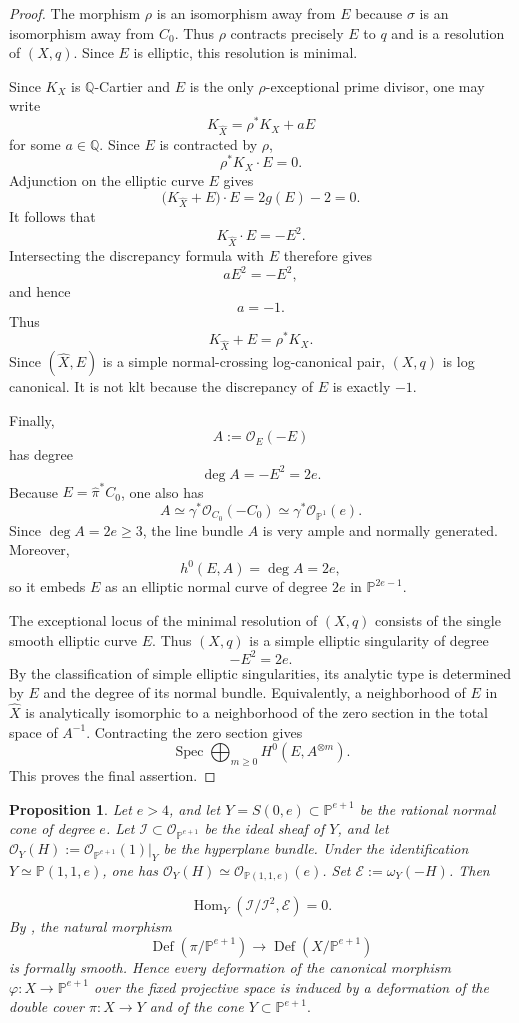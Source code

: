 \documentclass[11pt,twoside]{amsart}
\theoremstyle{plain}
\numberwithin{equation}{section}
\newtheorem{proposition}[theorem]{Proposition}
\theoremstyle{definition}
\begin{document}
\begin{proof}
The morphism $\rho$ is an isomorphism away from $E$ because $\sigma$ is an isomorphism away from $C_0$. Thus $\rho$ contracts precisely $E$ to $q$ and is a resolution of $(X,q)$. Since $E$ is elliptic, this resolution is minimal.

Since $K_X$ is $\mathbb Q$-Cartier and $E$ is the only $\rho$-exceptional prime divisor, one may write
\[
K_{\widehat X}
=
\rho^*K_X+aE
\]
for some $a\in\mathbb Q$. Since $E$ is contracted by $\rho$,
\[
\rho^*K_X\cdot E=0.
\]
Adjunction on the elliptic curve $E$ gives
\[
\bigl(K_{\widehat X}+E\bigr)\cdot E
=
2g(E)-2
=
0.
\]
It follows that
\[
K_{\widehat X}\cdot E=-E^2.
\]
Intersecting the discrepancy formula with $E$ therefore gives
\[
aE^2=-E^2,
\]
and hence
\[
a=-1.
\]
Thus
\[
K_{\widehat X}+E=\rho^*K_X.
\]
Since $(\widehat X,E)$ is a simple normal-crossing log-canonical pair, $(X,q)$ is log canonical. It is not klt because the discrepancy of $E$ is exactly $-1$.

Finally,
\[
A:=\mathcal O_E(-E)
\]
has degree
\[
\deg A=-E^2=2e.
\]
Because $E=\widehat\pi^*C_0$, one also has
\[
A
\simeq
\gamma^*\mathcal O_{C_0}(-C_0)
\simeq
\gamma^*\mathcal O_{\mathbb P^1}(e).
\]
Since $\deg A=2e\geq3$, the line bundle $A$ is very ample and normally generated. Moreover,
\[
h^0(E,A)=\deg A=2e,
\]
so it embeds $E$ as an elliptic normal curve of degree $2e$ in $\mathbb P^{2e-1}$.

The exceptional locus of the minimal resolution of $(X,q)$ consists of the single smooth elliptic curve $E$. Thus $(X,q)$ is a simple elliptic singularity of degree
\[
-E^2=2e.
\]
By the classification of simple elliptic singularities, its analytic type is determined by $E$ and the degree of its normal bundle. Equivalently, a neighborhood of $E$ in $\widehat X$ is analytically isomorphic to a neighborhood of the zero section in the total space of $A^{-1}$. Contracting the zero section gives
\[
\operatorname{Spec}
\bigoplus_{m\geq0}H^0\!\left(E,A^{\otimes m}\right).
\]
This proves the final assertion.
\end{proof}


\begin{proposition}\label{prop:hom-conormal-trace-zero-cone}
Let $e>4$, and let $Y=S(0,e)\subset \mathbb{P}^{e+1}$ be the rational normal cone of degree $e$. Let $\mathcal I\subset\mathcal O_{\mathbb{P}^{e+1}}$ be the ideal sheaf of $Y$, and let $\mathcal O_Y(H):=\mathcal O_{\mathbb{P}^{e+1}}(1)|_Y$ be the hyperplane bundle. Under the identification $Y\simeq\mathbb P(1,1,e)$, one has $\mathcal O_Y(H)\simeq\mathcal O_{\mathbb P(1,1,e)}(e)$. Set $\mathcal E:=\omega_Y(-H)$. Then

$$
\operatorname{Hom}_Y(\mathcal I/\mathcal I^2,\mathcal E)=0.
$$
By , the natural morphism
$$
\operatorname{Def}(\pi/\mathbb P^{e+1})
\longrightarrow
\operatorname{Def}(X/\mathbb P^{e+1})
$$
is formally smooth. Hence every deformation of the canonical morphism
$
\varphi:X\to\mathbb P^{e+1}
$
over the fixed projective space is induced by a deformation of the double cover
$
\pi:X\to Y
$
and of the cone
$
Y\subset\mathbb P^{e+1}.
$

\end{proposition}
\end{document}
